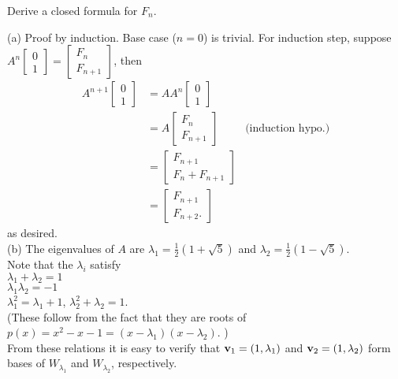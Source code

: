 \ii Derive  a closed formula for $F_n$. 

\ee
\begin{solution}
\noindent
(a) Proof by induction. Base case ($n=0$) is trivial. For induction step, suppose 
$A^n\begin{bmatrix}
0 \\ 1
\end{bmatrix}=\begin{bmatrix}
F_n\\ F_{n+1}
\end{bmatrix}$, then 
\begin{align*}
A^{n+1}\begin{bmatrix}
0\\ 1
\end{bmatrix}&=AA^n\begin{bmatrix}
0\\ 1
\end{bmatrix}\\
&=A\begin{bmatrix}
F_n\\ F_{n+1}
\end{bmatrix} &\text{(induction hypo.)}\\
&=\begin{bmatrix}
F_{n+1}\\ F_n+F_{n+1}
\end{bmatrix}\\
&=\begin{bmatrix}
F_{n+1}\\ F_{n+2}.
\end{bmatrix}
\end{align*}
as desired. 
\vspace{.1in}
\\
(b) The eigenvalues of $A$ are $\lambda_1=\frac{1}{2}(1+\sqrt{5})$ and $\lambda_2=\frac{1}{2}(1-\sqrt{5})$.
\\
Note that the $\lambda_i$ satisfy\\
$\lambda_1+\lambda_2=1$\\
$\lambda_1\lambda_2=-1$\\
$\lambda_1^2=\lambda_1+1$, $\lambda_2^2+\lambda_2=1$. 
\\
(These follow from the fact that they are roots of $p(x)=x^2-x-1=(x-\lambda_1)(x-\lambda_2)$. )
\vspace{.1in}
\\
From these relations it is easy to verify that 
${\mathbf v}_1=(1,\lambda_1)$ and ${\mathbf v}_2=(1,\lambda_2)$ form bases of $W_{\lambda_1}$ and $W_{\lambda_2}$, respectively. 
\vspace{.1in}

\end{solution}
